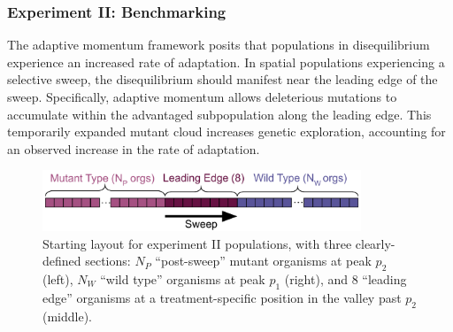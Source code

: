 \subsubsection{Experiment II: Benchmarking}

The adaptive momentum framework posits that populations in disequilibrium experience an increased rate of adaptation. %
In spatial populations experiencing a selective sweep, the disequilibrium should manifest near the leading edge of the sweep. 
Specifically, adaptive momentum allows deleterious mutations to accumulate within the advantaged subpopulation along the leading edge. 
This temporarily expanded mutant cloud increases genetic exploration, accounting for an observed increase in the rate of adaptation. 

\begin{figure}[h!]
\begin{center}
\includegraphics[width=0.85\textwidth]{05_adaptive_momentum/media/sweep_figure.pdf}
\caption{
    Starting layout for experiment II populations, with three clearly-defined sections: $N_P$ ``post-sweep'' mutant organisms at peak $p_{2}$ (left), $N_W$ ``wild type'' organisms at peak $p_{1}$ (right), and 8 ``leading edge'' organisms at a treatment-specific position in the valley past $p_{2}$ (middle).
}
\label{fig-experiment2}
\end{center}
\end{figure}

